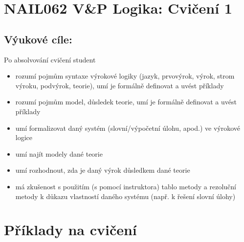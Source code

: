 \documentclass[a4paper,11pt]{amsart}
\begin{document}
\section*{NAIL062 V\&P Logika: Cvičení 1}

\subsection*{Výukové cíle:} Po absolvování cvičení student

    \begin{itemize}\setlength{\itemsep}{0pt}
        \item rozumí pojmům syntaxe výrokové logiky (jazyk, prvovýrok, výrok, strom výroku, podvýrok, teorie), umí je formálně definovat a uvést příklady
        \item rozumí pojmům model, důsledek teorie, umí je formálně definovat a uvést příklady
        \item umí formalizovat daný systém (slovní/výpočetní úlohu, apod.) ve výrokové logice
        \item umí najít modely dané teorie
        \item umí rozhodnout, zda je daný výrok důsledkem dané teorie
        \item má zkušenost s použitím (s pomocí instruktora) tablo metody a rezoluční metody k důkazu vlastností daného systému (např. k řešení slovní úlohy)
    \end{itemize}


\section*{Příklady na cvičení}
\end{document}
